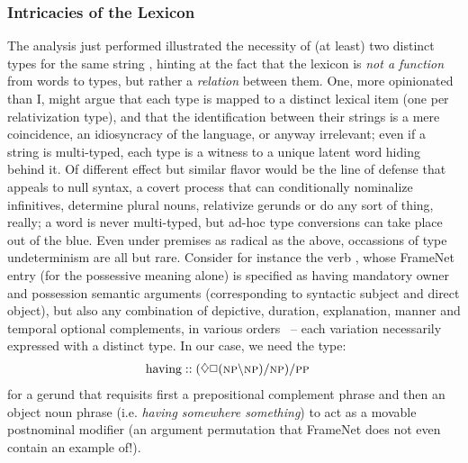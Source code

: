 \subsubsection{Intricacies of the Lexicon}
The analysis just performed illustrated the necessity of (at least) two distinct types for the same string , hinting at the fact that the lexicon is \textit{not a function} from words to types, but rather a \textit{relation} between them.
One, more opinionated than I, might argue that each type is mapped to a distinct lexical item (one per relativization type), and that the identification between their strings is a mere coincidence, an idiosyncracy of the language, or anyway irrelevant; even if a string is multi-typed, each type is a witness to a unique latent word hiding behind it.
Of different effect but similar flavor would be the line of defense that appeals to null syntax, a covert process that can conditionally nominalize infinitives, determine plural nouns, relativize gerunds or do any sort of thing, really; a word is never multi-typed, but ad-hoc type conversions can take place out of the blue.
Even under premises as radical as the above, occassions of type undeterminism are all but rare.
Consider for instance the verb , whose FrameNet entry (for the possessive meaning alone) is specified as having mandatory owner and possession semantic arguments (corresponding to syntactic subject and direct object), but also any combination of depictive, duration, explanation, manner and temporal optional complements, in various orders~\cite{baker1998berkeley} -- each variation necessarily expressed with a distinct type.
In our case, we need the type:
\begin{align*}
	\w{having} &:: (\diamond\Box(\np\divleft\np)\divright\np)\divright\pp
\end{align*}
for a gerund that requisits first a prepositional complement phrase and then an object noun phrase (i.e. \textit{having somewhere something}) to act as a movable postnominal modifier (an argument permutation that FrameNet does not even contain an example of!).

